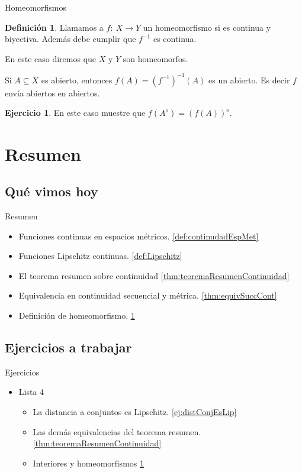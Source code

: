 \documentclass[utf8]{beamer}
\theoremstyle{plain}
\theoremstyle{definition}
\newtheorem{Def}{Definición}           %
\newtheorem{Ej}{Ejercicio}             %
\theoremstyle{remark}
\numberwithin{equation}{section}
\begin{document}
\begin{frame}{Homeomorfismos}
    \begin{Def}\label{def:homeomorfismo}
        Llamamos a $f:\ X\to Y$ un \alert{homeomorfismo} si es continua y biyectiva. Adem\'as debe cumplir que $f^{-1}$ es continua.\par 
        En este caso diremos que $X$ y $Y$ son \alert{homeomorfos}.
    \end{Def}
   Si $A\subseteq X$ es abierto, entonces $f(A)=(f^{-1})^{-1}(A)$ es un abierto. Es decir $f$ env\'ia abiertos en abiertos.
   \begin{Ej}\label{ej:homeomorfismoDeInterior}
       En este caso muestre que $f(A^o)=(f(A))^o$.
   \end{Ej}
\end{frame}

\section*{Resumen}

\subsection*{Qu\'e vimos hoy}
\begin{frame}{Resumen}

  \begin{itemize}
  \item Funciones continuas en espacios m\'etricos. \ref{def:continudadEspMet}
  \item Funciones Lipschitz continuas. \ref{def:Lipschitz}
  \item El teorema resumen sobre continuidad \ref{thm:teoremaResumenContinuidad}
  \item Equivalencia en continuidad secuencial y m\'etrica. \ref{thm:equivSuccCont}
  \item Definición de homeomorfismo. \ref{def:homeomorfismo}
  \end{itemize}
  
\end{frame}

\subsection*{Ejercicios a trabajar}
\begin{frame}{Ejercicios}
    
  \begin{itemize}
    \item
      Lista 4
      \begin{itemize}
      \item La distancia a conjuntos es Lipschitz. \ref{ej:distConjEsLip}
      \item Las dem\'as equivalencias del teorema resumen. \ref{thm:teoremaResumenContinuidad}
      \item Interiores y homeomorfismos \ref{ej:homeomorfismoDeInterior}
      \end{itemize}
    \end{itemize}
  
\end{frame}
\end{document}
